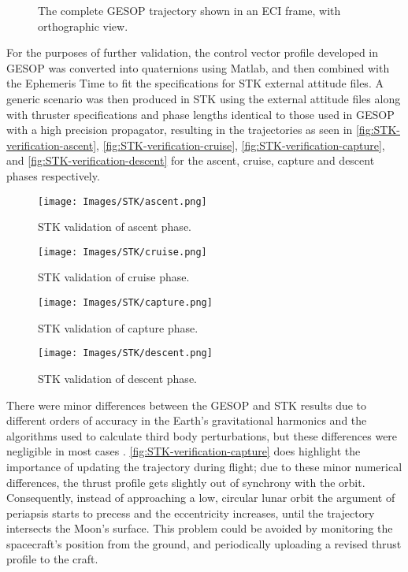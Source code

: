 \begin{figure}
\centering
\def\svgwidth{\textwidth}

\caption{The complete GESOP trajectory shown in an ECI frame, with orthographic view.} \label{fig:Whole-trajectory}
\end{figure}

For the purposes of further validation, the control vector profile developed in GESOP was converted into quaternions using Matlab, and then combined with the Ephemeris Time to fit the specifications for STK external attitude files. A generic scenario was then produced in STK using the external attitude files along with thruster specifications and phase lengths identical to those used in GESOP with a high precision propagator, resulting in the trajectories as seen in \autoref{fig:STK-verification-ascent}, \autoref{fig:STK-verification-cruise}, \autoref{fig:STK-verification-capture}, and \autoref{fig:STK-verification-descent} for the ascent, cruise, capture and descent phases respectively.

\begin{figure}
\centering
\texttt{[image: Images/STK/ascent.png]}
\caption{STK validation of ascent phase.} \label{fig:STK-verification-ascent}
\end{figure}


\begin{figure}
\centering
\texttt{[image: Images/STK/cruise.png]}
\caption{STK validation of cruise phase.} \label{fig:STK-verification-cruise}
\end{figure}


\begin{figure}
\centering
\texttt{[image: Images/STK/capture.png]}
\caption{STK validation of capture phase.} \label{fig:STK-verification-capture}
\end{figure}


\begin{figure}
\centering
\texttt{[image: Images/STK/descent.png]}
\caption{STK validation of descent phase.} \label{fig:STK-verification-descent}
\end{figure}

There were minor differences %
between the GESOP and STK results due to different orders of accuracy in the Earth's gravitational harmonics and the algorithms used to calculate third body perturbations, but these differences were negligible in most cases%
. \autoref{fig:STK-verification-capture} does highlight the importance of updating the trajectory during flight; due to these minor numerical differences, the thrust profile gets slightly out of synchrony with the orbit. Consequently, instead of approaching a low, circular lunar orbit the argument of periapsis starts to precess and the eccentricity increases, until the trajectory intersects the Moon's surface. This problem could be avoided by monitoring the spacecraft's position from the ground, and periodically uploading a revised thrust profile to the craft.

